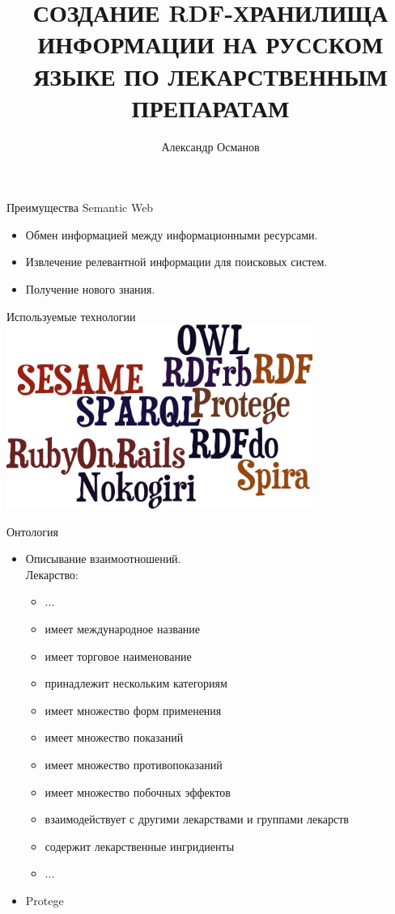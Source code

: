 \documentclass{beamer}
\author{Александр Османов}
\title{СОЗДАНИЕ RDF-ХРАНИЛИЩА ИНФОРМАЦИИ НА РУССКОМ ЯЗЫКЕ ПО ЛЕКАРСТВЕННЫМ ПРЕПАРАТАМ}
\institute{Кафедра технологий программирования}
\date{}
\begin{document}

\begin{frame}[t,plain]
\titlepage
\end{frame}

\begin{frame}[t]{Преимущества Semantic Web}
  \begin{itemize}
  \item Обмен информацией между информационными ресурсами.
  \item Извлечение релевантной информации для поисковых систем.
  \item Получение нового знания.
  \end{itemize}
\end{frame}

\begin{frame}[t,fragile]{Используемые технологии}
\includegraphics[width=100mm]{words.png}
\end{frame}
\begin{frame}[t]{Онтология}
  \begin{itemize}
  \item Описывание взаимоотношений.
    \\Лекарство:
    \begin{itemize}
    \item ...
    \item имеет международное название
    \item имеет торговое наименование
    \item принадлежит нескольким категориям
    \item имеет множество форм применения
    \item имеет множество показаний
    \item имеет множество противопоказаний
    \item имеет множество побочных эффектов
    \item взаимодействует с другими лекарствами и группами лекарств
    \item содержит лекарственные ингридиенты
    \item ...
    \end{itemize}
  \item Protege
  \end{itemize}
\end{frame}
\end{document}
